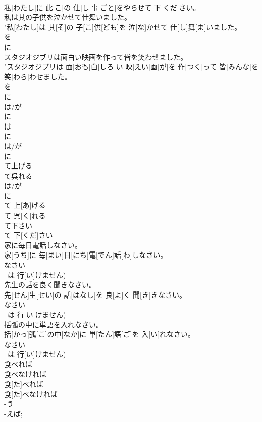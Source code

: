 \documentclass[8pt]{extreport}
\begin{document}
\begin{CJK}{UTF8}{min}
\\	私[わたし]に 此[こ]の 仕[し]事[ごと]をやらせて 下[くだ]さい。
\\	私は其の子供を泣かせて仕舞いました。	
\\	"私[わたし]は 其[そ]の 子[こ]供[ども]を 泣[な]かせて 仕[し]舞[ま]いました。 
\\	を 
\\	に 
\\	スタジオジブリは面白い映画を作って皆を笑わせました。	
\\	"スタジオジブリは 面[おも]白[しろ]い 映[えい]画[が]を 作[つく]って 皆[みんな]を 笑[わら]わせました。 
\\	を 
\\	に 
\\	は/が 
\\	に 
\\	は 
\\	に 
\\	は/が 
\\	に 
\\	て上げる 
\\	て呉れる	
\\	は/が 
\\	に 
\\	て 上[あ]げる 
\\	て 呉[く]れる
\\	て下さい	
\\	て 下[くだ]さい
\\	家に毎日電話しなさい。	
\\	家[うち]に 毎[まい]日[にち]電[でん]話[わ]しなさい。 
\\	なさい 
\\	~は 行[い]けません)
\\	先生の話を良く聞きなさい。	
\\	先[せん]生[せい]の 話[はなし]を 良[よ]く 聞[き]きなさい。 
\\	なさい 
\\	~は 行[い]けません)
\\	括弧の中に単語を入れなさい。	
\\	括[かっ]弧[こ]の中[なか]に 単[たん]語[ご]を 入[い]れなさい。 
\\	なさい 
\\	~は 行[い]けません)
\\	食べれば 
\\	食べなければ	
\\	食[た]べれば 
\\	食[た]べなければ
\\	-う 
\\	-えば; 

\end{CJK}
\end{document}
